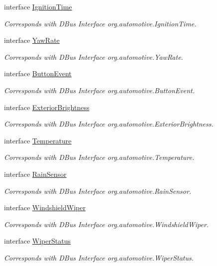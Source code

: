 \begin{DoxyCompactItemize}
interface \hyperlink{interfaceIgnitionTime}{Ignition\+Time}
\begin{DoxyCompactList}\small\item\em Corresponds with D\+Bus Interface org.\+automotive.\+Ignition\+Time. \end{DoxyCompactList}\item 
interface \hyperlink{interfaceYawRate}{Yaw\+Rate}
\begin{DoxyCompactList}\small\item\em Corresponds with D\+Bus Interface org.\+automotive.\+Yaw\+Rate. \end{DoxyCompactList}\item 
interface \hyperlink{interfaceButtonEvent}{Button\+Event}
\begin{DoxyCompactList}\small\item\em Corresponds with D\+Bus Interface org.\+automotive.\+Button\+Event. \end{DoxyCompactList}\item 
interface \hyperlink{interfaceExteriorBrightness}{Exterior\+Brightness}
\begin{DoxyCompactList}\small\item\em Corresponds with D\+Bus Interface org.\+automotive.\+Exterior\+Brightness. \end{DoxyCompactList}\item 
interface \hyperlink{interfaceTemperature}{Temperature}
\begin{DoxyCompactList}\small\item\em Corresponds with D\+Bus Interface org.\+automotive.\+Temperature. \end{DoxyCompactList}\item 
interface \hyperlink{interfaceRainSensor}{Rain\+Sensor}
\begin{DoxyCompactList}\small\item\em Corresponds with D\+Bus Interface org.\+automotive.\+Rain\+Sensor. \end{DoxyCompactList}\item 
interface \hyperlink{interfaceWindshieldWiper}{Windshield\+Wiper}
\begin{DoxyCompactList}\small\item\em Corresponds with D\+Bus Interface org.\+automotive.\+Windshield\+Wiper. \end{DoxyCompactList}\item 
interface \hyperlink{interfaceWiperStatus}{Wiper\+Status}
\begin{DoxyCompactList}\small\item\em Corresponds with D\+Bus Interface org.\+automotive.\+Wiper\+Status. \end{DoxyCompactList}\item 

\end{DoxyCompactItemize}
